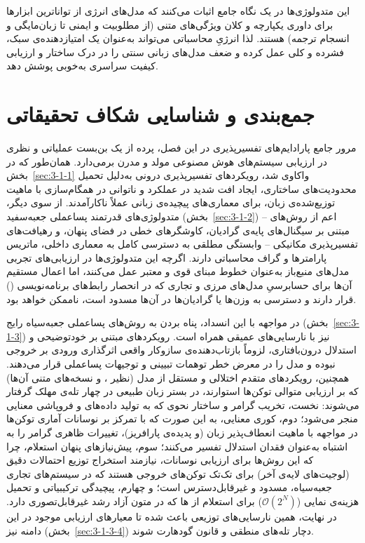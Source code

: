 این متدولوژی‌ها در یک نگاه جامع اثبات می‌کنند که مدل‌های انرژی از تواناترین ابزارها برای داوری یکپارچه و کلان ویژگی‌های متنی (از مطلوبیت و ایمنی تا زبان‌مایگی و انسجام ترجمه) هستند. لذا انرژیِ محاسباتی می‌تواند به‌عنوان یک امتیازدهنده‌ی سبک، فشرده و کلی عمل کرده و ضعف مدل‌های زبانی سنتی را در درک ساختار و ارزیابی کیفیت سراسری به‌خوبی پوشش دهد.






\section{جمع‌بندی و شناسایی شکاف تحقیقاتی}\label{sec:3-3}

مرور جامع پارادایم‌های تفسیرپذیری در این فصل، پرده از یک بن‌بست عملیاتی و نظری در ارزیابی سیستم‌های هوش مصنوعی مولد و مدرن برمی‌دارد. همان‌طور که در بخش~\ref{sec:3-1-1} واکاوی شد، رویکردهای تفسیرپذیری درونی به‌دلیل تحمیل محدودیت‌های ساختاری، ایجاد افت شدید در عملکرد و ناتوانی در همگام‌سازی با ماهیت توزیع‌شده‌ی زبان، برای معماری‌های پیچیده‌ی زبانی عملاً ناکارآمدند. از سوی دیگر، متدولوژی‌های قدرتمند پساعملی جعبه‌سفید (بخش~\ref{sec:3-1-2}) – اعم از روش‌های مبتنی بر سیگنال‌های پایه‌ی گرادیان، کاوشگرهای خطی در فضای پنهان، و رهیافت‌های تفسیرپذیری مکانیکی – وابستگی مطلقی به دسترسی کامل به معماری داخلی، ماتریس پارامترها و گراف محاسباتی دارند. اگرچه این متدولوژی‌ها در ارزیابی‌های تجربی مدل‌های منبع‌باز به‌عنوان خطوط مبنای قوی و معتبر عمل می‌کنند، اما اعمال مستقیم آن‌ها برای حسابرسیِ مدل‌های مرزی و تجاری که در انحصار رابط‌های برنامه‌نویسی () قرار دارند و دسترسی به وزن‌ها یا گرادیان‌ها در آن‌ها مسدود است، ناممکن خواهد بود.

در مواجهه با این انسداد، پناه بردن به روش‌های پساعملی جعبه‌سیاه رایج (بخش~\ref{sec:3-1-3}) نیز با نارسایی‌های عمیقی همراه است. رویکردهای مبتنی بر خودتوضیحی و استدلال درون‌بافتاری، لزوماً بازتاب‌دهنده‌ی سازوکار واقعی اثرگذاری ورودی بر خروجی نبوده و مدل را در معرض خطر توهمات تبیینی و توجیهات پساعملی قرار می‌دهند. همچنین، رویکردهای متقدم اختلالی و مستقل از مدل (نظیر ،  و نسخه‌های متنی آن‌ها) که بر ارزیابی متوالی توکن‌ها استوارند، در بستر زبان طبیعی در چهار تله‌ی مهلک گرفتار می‌شوند: نخست، تخریب گرامر و ساختار نحوی که به تولید داده‌های  و فروپاشی معنایی منجر می‌شود؛ دوم، کوری معنایی، به این صورت که با تمرکز بر نوسانات آماری توکن‌ها در مواجهه با ماهیت انعطاف‌پذیر زبان (و پدیده‌ی پارافریز)، تغییرات ظاهری گرامر را به اشتباه به‌عنوان فقدان استدلال تفسیر می‌کنند؛ سوم، پیش‌نیازهای پنهان استعلام، چرا که این روش‌ها برای ارزیابی نوسانات، نیازمند استخراج توزیع احتمالات دقیق (لوجیت‌های لایه‌ی آخر) برای تک‌تک توکن‌های خروجی هستند که در سیستم‌های تجاری جعبه‌سیاه، مسدود و غیرقابل‌دسترس است؛ و چهارم، پیچیدگی ترکیبیاتی و تحمیل هزینه‌ی نمایی ($\mathcal{O}(2^N)$) برای استعلام از ها که در متون آزاد رشد غیرقابل‌تصوری دارد. در نهایت، همین نارسایی‌های توزیعی باعث شده تا معیارهای ارزیابی موجود در این دامنه نیز (بخش~\ref{sec:3-1-3-4}) دچار تله‌های منطقی و قانون گودهارت شوند.

